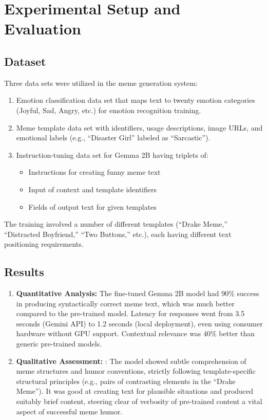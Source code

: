 \documentclass[conference]{IEEEtran}
\begin{document}
\section{Experimental Setup and Evaluation}
\subsection{Dataset}
Three data sets were utilized in the meme generation system:
\begin{enumerate}
    \item Emotion classification data set that maps text to twenty emotion categories (Joyful, Sad, Angry, etc.) for emotion recognition training.
    \item Meme template data set with identifiers, usage descriptions, image URLs, and emotional labels (e.g., “Disaster Girl” labeled as “Sarcastic”).
    \item Instruction-tuning data set for Gemma 2B having triplets of:
    \begin{itemize}
        \item Instructions for creating funny meme text
        \item Input of context and template identifiers
        \item Fields of output text for given templates
    \end{itemize}
\end{enumerate}

The training involved a number of different templates (“Drake Meme,” “Distracted Boyfriend,” “Two Buttons,” etc.), each having different text positioning requirements.

\subsection{Results}
\begin{enumerate}
    \item \textbf{Quantitative Analysis:} The fine-tuned Gemma 2B model had 90\% success in producing syntactically correct meme text, which was much better compared to the pre-trained model. Latency for responses went from 3.5 seconds (Gemini API) to 1.2 seconds (local deployment), even using consumer hardware without GPU support. Contextual relevance was 40\% better than generic pre-trained models.
    \item \textbf{Qualitative Assessment:} : The model showed subtle comprehension of meme structures and humor conventions, strictly following template-specific structural principles (e.g., pairs of contrasting elements in the “Drake Meme”). It was good at creating text for plausible situations and produced suitably brief content, steering clear of verbosity of pre-trained content a vital aspect of successful meme humor.
\end{enumerate}
\end{document}
